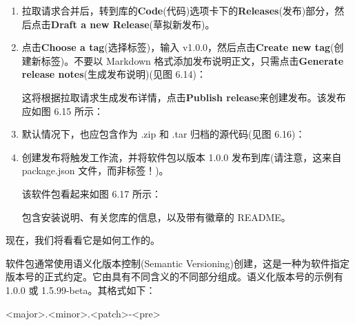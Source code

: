 \begin{enumerate}
\item 
拉取请求合并后，转到库的\textbf{Code}(代码)选项卡下的\textbf{Releases}(发布)部分，然后点击\textbf{Draft a new Release}(草拟新发布)。

\item 
点击\textbf{Choose a tag}(选择标签)，输入 v1.0.0，然后点击\textbf{Create new tag}(创建新标签)。不要以 Markdown 格式添加发布说明正文，只需点击\textbf{Generate release notes}(生成发布说明)(见图 6.14)：


这将根据拉取请求生成发布详情，点击\textbf{Publish release}来创建发布。该发布应如图 6.15 所示：


\item 
默认情况下，也应包含作为 .zip 和 .tar 归档的源代码(见图 6.16)：


\item 
创建发布将触发工作流，并将软件包以版本 1.0.0 发布到库(请注意，这来自 package.json 文件，而非标签！)。

该软件包看起来如图 6.17 所示：


包含安装说明、有关您库的信息，以及带有徽章的 README。

\end{enumerate}


现在，我们将看看它是如何工作的。


软件包通常使用语义化版本控制(Semantic Versioning)创建，这是一种为软件指定版本号的正式约定。它由具有不同含义的不同部分组成。语义化版本号的示例有 1.0.0 或 1.5.99-beta。其格式如下：

\begin{shell}
<major>.<minor>.<patch>-<pre>
\end{shell}

